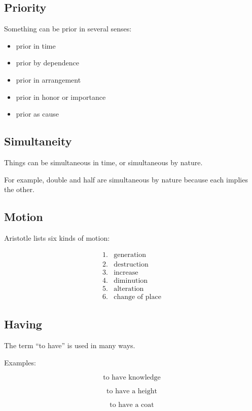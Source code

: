 \documentclass[12pt]{article}
\begin{document}
\subsection*{Priority}

Something can be prior in several senses:

\begin{itemize}[itemsep=0.25em]
    \item prior in time
    \item prior by dependence
    \item prior in arrangement
    \item prior in honor or importance
    \item prior as cause
\end{itemize}

\subsection*{Simultaneity}

Things can be simultaneous in time, or simultaneous by nature.

For example, double and half are simultaneous by nature because each implies the
other.

\subsection*{Motion}

Aristotle lists six kinds of motion:

\[
\begin{array}{ll}
1. & \text{generation} \\
2. & \text{destruction} \\
3. & \text{increase} \\
4. & \text{diminution} \\
5. & \text{alteration} \\
6. & \text{change of place}
\end{array}
\]

\subsection*{Having}

The term ``to have'' is used in many ways.

Examples:

\[
\text{to have knowledge}
\]

\[
\text{to have a height}
\]

\[
\text{to have a coat}
\]
\end{document}

